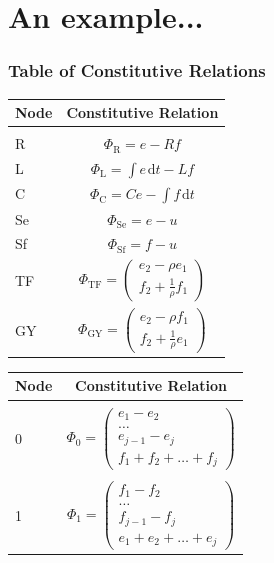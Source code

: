 \documentclass[11pt,reqno]{beamer}
\newcommand{\df}[1]{\mspace{2mu}  \mathrm{d}#1}
\begin{document}
\section{An example...}
\begin{frame}
\frametitle{Table of Constitutive Relations}
\begin{small}
\begin{minipage}[c][\textheight][t]{0.4\textwidth}
\vspace{0.75cm}
\begin{tabular}{| l | c |}
	Node & Constitutive Relation\\
	\hline
	& \\
	R & $\Phi_\text{R} = e -Rf$\\
	L & $\Phi_\text{L} = \int e\df{t} - Lf$\\
	C & $\Phi_\text{C} = Ce - \int f \df{t}$\\
	Se & $\Phi_\text{Se} = e - u$\\
	Sf & $\Phi_\text{Sf} = f - u$\\
	TF & $\Phi_\text{TF} =\left(\begin{matrix}
	e_2 - \rho e_1 \\
	f_2 +\frac{1}{\rho}f_1
	\end{matrix} \right)$\\
	GY & $\Phi_\text{GY} =\left(\begin{matrix}
	e_2 - \rho f_1 \\
	f_2 +\frac{1}{\rho}e_1
	\end{matrix} \right)$
\end{tabular}
\end{minipage}\hfill
\begin{minipage}[c][\textheight][t]{0.45\textwidth}
	\vspace{0.75cm}
\begin{tabular}{| l | c |}
	Node & Constitutive Relation\\
	\hline
	&\\
	0 &$	\Phi_\text{0} = \left(\begin{matrix}
	e_1 -e_2\\
	\ldots\\
	e_{j-1} - e_j\\
	f_1 + f_2 + \ldots + f_j 
	\end{matrix}\right)$\\
	&
	\\
	1&$	\Phi_\text{1} = \left(\begin{matrix}
	f_1 -f_2\\
	\ldots\\
	f_{j-1} - f_j\\
	e_1 + e_2 + \ldots + e_j 
	\end{matrix}\right)$
\end{tabular}
\end{minipage}
\end{small}
\end{frame}
\end{document}
